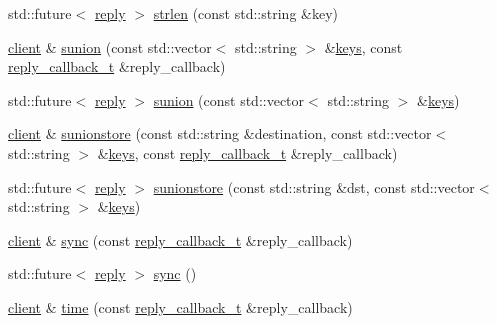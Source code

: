 \begin{DoxyCompactItemize}
\item 
std\+::future$<$ \hyperlink{classcpp__redis_1_1reply}{reply} $>$ \hyperlink{classcpp__redis_1_1client_a6b9f2a3a8952de874a9a6e1555c85195}{strlen} (const std\+::string \&key)
\item 
\hyperlink{classcpp__redis_1_1client}{client} \& \hyperlink{classcpp__redis_1_1client_a7128cdf97d9f768b117bab5843059fe1}{sunion} (const std\+::vector$<$ std\+::string $>$ \&\hyperlink{classcpp__redis_1_1client_acb7845a206b2321e6919c2f38282c322}{keys}, const \hyperlink{classcpp__redis_1_1client_a061a1140d36d2eaeda82b09a0bb3f9f2}{reply\+\_\+callback\+\_\+t} \&reply\+\_\+callback)
\item 
std\+::future$<$ \hyperlink{classcpp__redis_1_1reply}{reply} $>$ \hyperlink{classcpp__redis_1_1client_a7f76d091899206932d250edf3f990e94}{sunion} (const std\+::vector$<$ std\+::string $>$ \&\hyperlink{classcpp__redis_1_1client_acb7845a206b2321e6919c2f38282c322}{keys})
\item 
\hyperlink{classcpp__redis_1_1client}{client} \& \hyperlink{classcpp__redis_1_1client_a26f38c6a8b7f03cd6ec9d5e4d121be32}{sunionstore} (const std\+::string \&destination, const std\+::vector$<$ std\+::string $>$ \&\hyperlink{classcpp__redis_1_1client_acb7845a206b2321e6919c2f38282c322}{keys}, const \hyperlink{classcpp__redis_1_1client_a061a1140d36d2eaeda82b09a0bb3f9f2}{reply\+\_\+callback\+\_\+t} \&reply\+\_\+callback)
\item 
std\+::future$<$ \hyperlink{classcpp__redis_1_1reply}{reply} $>$ \hyperlink{classcpp__redis_1_1client_af71da68029a24b52a5005a24c859893d}{sunionstore} (const std\+::string \&dst, const std\+::vector$<$ std\+::string $>$ \&\hyperlink{classcpp__redis_1_1client_acb7845a206b2321e6919c2f38282c322}{keys})
\item 
\hyperlink{classcpp__redis_1_1client}{client} \& \hyperlink{classcpp__redis_1_1client_a47d8402e7fa9f7b8a021356baf83fd1f}{sync} (const \hyperlink{classcpp__redis_1_1client_a061a1140d36d2eaeda82b09a0bb3f9f2}{reply\+\_\+callback\+\_\+t} \&reply\+\_\+callback)
\item 
std\+::future$<$ \hyperlink{classcpp__redis_1_1reply}{reply} $>$ \hyperlink{classcpp__redis_1_1client_a09c4ffbad45c8ee8a171333ed81c8d43}{sync} ()
\item 
\hyperlink{classcpp__redis_1_1client}{client} \& \hyperlink{classcpp__redis_1_1client_aa98df57ae17365aaf0405b60f4711e92}{time} (const \hyperlink{classcpp__redis_1_1client_a061a1140d36d2eaeda82b09a0bb3f9f2}{reply\+\_\+callback\+\_\+t} \&reply\+\_\+callback)
\item 

\end{DoxyCompactItemize}
